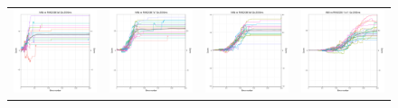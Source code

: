 \begin{figure}
\begin{tabular}{cccc}
\hspace{-0.5cm}\includegraphics[width = 1.55in]{images/Visualizations/ANNvsRANDOM/2000ms5x5.png} &
\hspace{-0.5cm}\includegraphics[width = 1.55in]{images/Visualizations/ANNvsRANDOM/2000ms7x7.png} &
\hspace{-0.5cm}\includegraphics[width = 1.55in]{images/Visualizations/ANNvsRANDOM/2000ms9x9.png} &
\hspace{-0.5cm}\includegraphics[width = 1.55in]{images/Visualizations/ANNvsRANDOM/2000ms11x11.png} \\


\end{tabular}
\end{figure}

